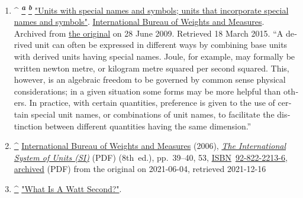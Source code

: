 \documentclass[
]{article}
\newenvironment{LTR}{\beginL}{\endL}
\begin{document}
\begin{LTR}
\begin{otherlanguage}{english}
\begin{enumerate}
  \label{cite_note-26}{{\textbf{\hyperref[cite_ref-26]{\^{}}}}
  {\href{/wiki/Richard_Feynman}{Feynman, Richard} (1963).
  \href{http://www.numericana.com/answer/feynman.htm}{"Physical Units"}.
  \emph{Feynman\textquotesingle s Lectures on Physics}{. Retrieved
  {2014-03-07}}.{}}}
\item
  \label{cite_note-BIPM2-27}{{\^{}
  \hyperref[cite_ref-BIPM2_27-0]{\textsuperscript{\emph{\textbf{a}}}}
  \hyperref[cite_ref-BIPM2_27-1]{\textsuperscript{\emph{\textbf{b}}}}}
  {\href{https://web.archive.org/web/20090628084157/http://www.bipm.org/en/si/si_brochure/chapter2/2-2/2-2-2.html}{"Units
  with special names and symbols; units that incorporate special names
  and symbols"}.
  \href{/wiki/International_Bureau_of_Weights_and_Measures}{International
  Bureau of Weights and Measures}. Archived from
  \href{http://www.bipm.org/en/si/si_brochure/chapter2/2-2/2-2-2.html}{the
  original} on 28 June 2009{. Retrieved {18 March} 2015}. ``A derived
  unit can often be expressed in different ways by combining base units
  with derived units having special names. Joule, for example, may
  formally be written newton metre, or kilogram metre squared per second
  squared. This, however, is an algebraic freedom to be governed by
  common sense physical considerations; in a given situation some forms
  may be more helpful than others. In practice, with certain quantities,
  preference is given to the use of certain special unit names, or
  combinations of unit names, to facilitate the distinction between
  different quantities having the same dimension.''{}}}
\item
  \label{cite_note-28}{{\textbf{\hyperref[cite_ref-28]{\^{}}}}
  {\href{/wiki/International_Bureau_of_Weights_and_Measures}{International
  Bureau of Weights and Measures} (2006),
  \href{https://www.bipm.org/documents/20126/41483022/si_brochure_8.pdf}{\emph{The
  International System of Units (SI)}} {(PDF)} (8th~ed.), pp.~39--40,
  53,
  \href{/wiki/ISBN_(identifier)}{ISBN}~\href{/wiki/Special:BookSources/92-822-2213-6}{92-822-2213-6},
  \href{https://web.archive.org/web/20210604163219/https://www.bipm.org/documents/20126/41483022/si_brochure_8.pdf}{archived}
  {(PDF)} from the original on 2021-06-04{, retrieved {2021-12-16}}{}}}
\item
  \label{cite_note-29}{{\textbf{\hyperref[cite_ref-29]{\^{}}}}
  {\href{http://www.imaginginfo.com/print/Studio-Photography/What-Is-A-Watt-Second/3$1043}{"What
  Is A Watt Second?"}.{}}}
\end{enumerate}


\end{otherlanguage}
\end{LTR}
\end{document}
